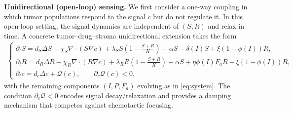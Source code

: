 \documentclass[pdflatex,sn-mathphys-ay]{sn-jnl}
\theoremstyle{thmstyleone}
\theoremstyle{definition}
\theoremstyle{remark}
\begin{document}
\medskip
\noindent\textbf{Unidirectional (open-loop) sensing.}
We first consider a one-way coupling in which tumor populations respond to the signal $c$ but do not regulate it. 
In this open-loop setting, the signal dynamics are independent of $(S,R)$ and relax in time. 
A concrete tumor--drug--stroma unidirectional extension takes the form
\begin{align}
\label{eq:oneway_damping}
\begin{cases}
\partial_t S = d_S\Delta S - \chi_S\nabla\cdot(S\nabla c) 
+ \lambda_S S\left(1 - \tfrac{S+R}{K}\right) - \alpha S - \delta(I)S + \xi(1 - \phi(I))R, \\[4pt]
\partial_t R = d_R\Delta R - \chi_R\nabla\cdot(R\nabla c) 
+ \lambda_R R\left(1 - \tfrac{S+R}{K}\right) + \alpha S + \eta\phi(I)F_aR - \xi(1 - \phi(I))R, \\[4pt]
\partial_t c = d_c\Delta c + \mathcal{Q}(c), \qquad \partial_c\mathcal{Q}(c) < 0,
\end{cases}
\end{align}
with the remaining components $(I,P,F_a)$ evolving as in \eqref{eq:system}. 
The condition $\partial_c\mathcal{Q}<0$ encodes signal decay/relaxation and provides a damping mechanism that competes against chemotactic focusing.
\end{document}
